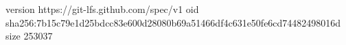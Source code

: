 version https://git-lfs.github.com/spec/v1
oid sha256:7b15c79e1d25bdcc83e600d28080b69a51466df4c631e50fe6cd74482498016d
size 253037
